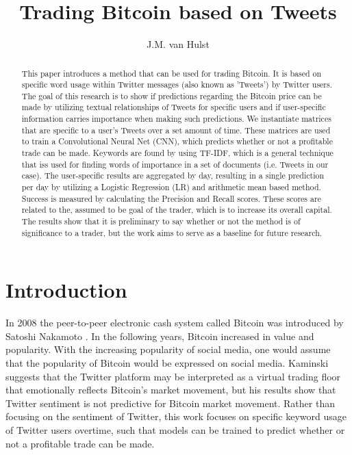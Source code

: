 \documentclass[sigconf]{acmart-txmm}
\begin{document}
\title{Trading Bitcoin based on Tweets}

\author{J.M. van Hulst}

\renewcommand{\shortauthors}{J.M. van Hulst}
\renewcommand{\shorttitle}{Twitter based Bitcoin trading}

\begin{abstract}
This paper introduces a method that can be used for trading Bitcoin. It is based on specific word usage within Twitter messages (also known as 'Tweets') by Twitter users. The goal of this research is to show if predictions regarding the Bitcoin price can be made by utilizing textual relationships of Tweets for specific users and if user-specific information carries importance when making such predictions. We instantiate matrices that are specific to a user's Tweets over a set amount of time. These matrices are used to train a Convolutional Neural Net (CNN), which predicts whether or not a profitable trade can be made. Keywords are found by using TF-IDF, which is a general technique that iss used for finding words of importance in a set of documents (i.e. Tweets in our case).  The user-specific results are aggregated by day, resulting in a single prediction per day by utilizing a Logistic Regression (LR) and arithmetic mean based method. Success is measured by calculating the Precision and Recall scores. These scores are related to the, assumed to be goal of the trader, which is to increase its overall capital. The results show that it is preliminary to say whether or not the method is of significance to a trader, but the work aims to serve as a baseline for future research.
\end{abstract}

\maketitle

\section{Introduction}
\label{sec:intro}
In 2008 the peer-to-peer electronic cash system called Bitcoin was introduced by Satoshi Nakamoto \cite{Nakamoto_bitcoin:a}. In the following years, Bitcoin increased in value and popularity. With the increasing popularity of social media, one would assume that the popularity of Bitcoin would be expressed on social media. Kaminski \cite{1406.7577} suggests that the Twitter platform may be interpreted as a virtual trading floor that emotionally reflects Bitcoin's market movement, but his results show that Twitter sentiment is not predictive for Bitcoin market movement. Rather than focusing on the sentiment of Twitter, this work focuses on specific keyword usage of Twitter users overtime, such that models can be trained to predict whether or not a profitable trade can be made.
\end{document}
